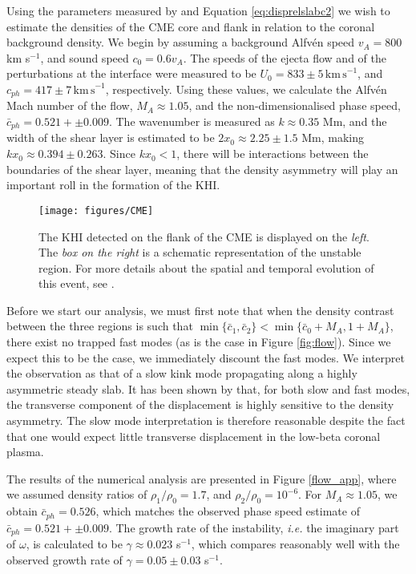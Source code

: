 Using the parameters measured by \cite{Foullon2011} and Equation \ref{eq:disprelslabc2} we wish to estimate the densities of the CME core and flank in relation to the coronal background density.
We begin by assuming a background Alfv\'en speed $v_A = 800$ km s$^{-1}$, and sound speed $c_0 = 0.6 v_A$.
The speeds of the ejecta flow and of the perturbations at the interface were measured to be $U_0 = 833 \pm 5 \, \mathrm{km \, s}^{-1}$, and $c_{ph} = 417 \pm 7 \, \mathrm{km \, s}^{-1}$, respectively.
Using these values, we calculate the Alfv\'en Mach number of the flow, $M_A \approx 1.05$, and the non-dimensionalised phase speed, $\bar c_{ph} = 0.521 + \pm 0.009$.
The wavenumber is measured as $k \approx 0.35$ Mm, and the width of the shear layer is estimated to be $2 x_0 \approx 2.25 \pm 1.5$ Mm, making $k x_0 \approx 0.394 \pm 0.263$.
Since $k x_0 < 1$, there will be interactions between the boundaries of the shear layer, meaning that the density asymmetry will play an important roll in the formation of the KHI.

\begin{figure}[!t]
\centering
\texttt{[image: figures/CME]}
\caption{The KHI detected on the flank of the CME is displayed on the \textit{left}. The \textit{box on the right} is a schematic representation of the unstable region. For more details about the spatial and temporal evolution of this event, see \citet{Foullon2011}.}
\label{CME}
\end{figure}

Before we start our analysis, we must first note that when the density contrast between the three regions is such that $\min\{\bar c_1, \bar c_2\} < \min\{\bar c_0 + M_A, 1 + M_A\}$, there exist no trapped fast modes (as is the case in Figure \ref{fig:flow}).
Since we expect this to be the case, we immediately discount the fast modes.
We interpret the observation as that of a slow kink mode propagating along a highly asymmetric steady slab.
It has been shown by \cite{Allcock2017} that, for both slow and fast modes, the transverse component of the displacement is highly sensitive to the density asymmetry.
The slow mode interpretation is therefore reasonable despite the fact that one would expect little transverse displacement in the low-beta coronal plasma.

The results of the numerical analysis are presented in Figure \ref{flow_app}, where we assumed density ratios of $\rho_1/\rho_0 = 1.7$, and $\rho_2/\rho_0 = 10^{-6}$.
For $M_A \approx 1.05$, we obtain $\bar c_{ph} = 0.526$, which matches the observed phase speed estimate of $\bar c_{ph} = 0.521 + \pm 0.009$.
The growth rate of the instability, \textit{i.e.} the imaginary part of $\omega$, is calculated to be $\gamma \approx 0.023$ s$^{-1}$, which compares reasonably well with the observed growth rate of $\gamma = 0.05 \pm 0.03$ s$^{-1}$.

